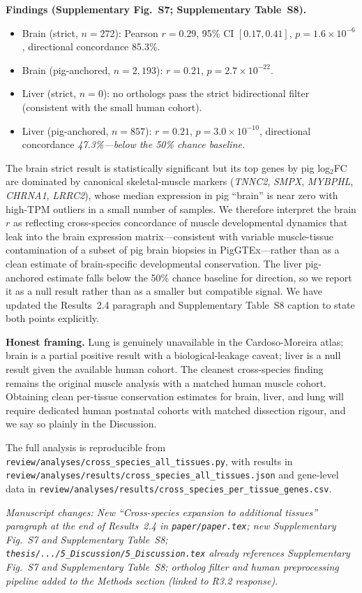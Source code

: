 \documentclass[11pt,a4paper]{article}
\newcommand{\changeloc}[1]{\par\noindent\textit{\small Manuscript changes: #1}\par}
\begin{document}
{\textbf{Findings (Supplementary Fig.~S7; Supplementary Table~S8).}
\begin{itemize}[leftmargin=*, itemsep=2pt, topsep=2pt]
  \item Brain (strict, $n = 272$): Pearson $r = 0.29$, 95\% CI
        $[0.17, 0.41]$, $p = 1.6 \times 10^{-6}$, directional
        concordance 85.3\%.
  \item Brain (pig-anchored, $n = 2{,}193$): $r = 0.21$, $p = 2.7
        \times 10^{-22}$.
  \item Liver (strict, $n = 0$): no orthologs pass the strict
        bidirectional filter (consistent with the small human cohort).
  \item Liver (pig-anchored, $n = 857$): $r = 0.21$, $p = 3.0 \times
        10^{-10}$, directional concordance \emph{47.3\%---below the
        50\% chance baseline.}
\end{itemize}
The brain strict result is statistically significant but its top
genes by pig log$_2$FC are dominated by canonical skeletal-muscle
markers (\textit{TNNC2}, \textit{SMPX}, \textit{MYBPHL}, \textit{CHRNA1},
\textit{LRRC2}), whose median expression in pig ``brain'' is near zero
with high-TPM outliers in a small number of samples. We therefore
interpret the brain $r$ as reflecting cross-species concordance of
muscle developmental dynamics that leak into the brain expression
matrix---consistent with variable muscle-tissue contamination of a
subset of pig brain biopsies in PigGTEx---rather than as a clean
estimate of brain-specific developmental conservation. The liver
pig-anchored estimate falls below the 50\% chance baseline for
direction, so we report it as a null result rather than as a smaller
but compatible signal. We have updated the Results~2.4 paragraph and
Supplementary Table~S8 caption to state both points explicitly.

\textbf{Honest framing.} Lung is genuinely unavailable in the
Cardoso-Moreira atlas; brain is a partial positive result with a
biological-leakage caveat; liver is a null result given the available
human cohort. The cleanest cross-species finding remains the original
muscle analysis with a matched human muscle cohort. Obtaining clean
per-tissue conservation estimates for brain, liver, and lung will
require dedicated human postnatal cohorts with matched dissection
rigour, and we say so plainly in the Discussion.

The full analysis is reproducible from
\texttt{review/analyses/cross\_species\_all\_tissues.py}, with results
in \texttt{review/analyses/results/cross\_species\_all\_tissues.json}
and gene-level data in
\texttt{review/analyses/results/cross\_species\_per\_tissue\_genes.csv}.}
\changeloc{New ``Cross-species expansion to additional tissues''
paragraph at the end of Results~2.4 in \texttt{paper/paper.tex}; new
Supplementary Fig.~S7 and Supplementary Table~S8;
\texttt{thesis/.../5\_Discussion/5\_Discussion.tex} already references
Supplementary Fig.~S7 and Supplementary Table~S8; ortholog filter and human
preprocessing pipeline added to the Methods section (linked to R3.2
response).}
\end{document}
